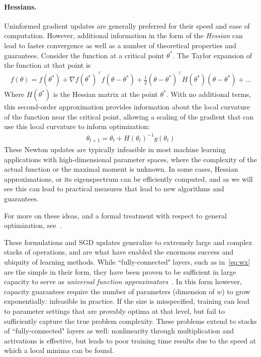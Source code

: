 \paragraph{Hessians.}
Uninformed gradient updates
are generally preferred
for their speed and ease of computation.
However, additional information in the form of the \textit{Hessian}
can lead to faster convergence
as well as a number of theoretical properties and guarantees.
Consider the function at a critical point $\theta^*$.
The Taylor expansion of the function at that point is
\begin{align}
f(\theta) = f(\theta^*) + \nabla f(\theta^*)^\top f(\theta - \theta^*) + \frac{1}{2}(\theta - \theta^*)^\top H(\theta^*)(\theta - \theta^*) + \ldots
\end{align}
Where $H(\theta^*)$ is the Hessian matrix at the point $\theta^*$. 
With no additional terms, this second-order approximation provides information
about the local curvature of the function near the critical point,
allowing a scaling of the gradient that can use this local 
curvature to inform optimization:
\begin{align}\label{eq:newtonstep}
	\theta_{t+1} = \theta_t + H(\theta_t)^{-1} g(\theta_t)
\end{align}
These Newton updates are typically infeasible in most
machine learning applications with high-dimensional
parameter spaces, where the complexity of
the actual function or the maximal moment is unknown.
In some cases, Hessian approximations,
or its eigenspectrum can be efficiently computed,
and as we will see this can lead to 
practical measures that lead to new
algorithms and guarantees.

For more on these ideas, 
and a formal treatment with respect to 
general optimization, see~\cite{wright1999numerical}.

These formulations and SGD updates generalize
to extremely large and complex stacks
of operations, and are what have enabled
the enormous success and ubiquity of learning
methods.
While ``fully-connected" layers, such as
in~\eqref{eq:wx} are the simple in their form,
they have been proven to be sufficient
in large capacity to serve as
\textit{universal function approximators}~\citep{cybenko1989approximation}.
In this form however, capacity guarantees
require the number of parameters (dimension of $w$)
to grow exponentially: infeasible in practice.
If the size is misspecified, training
can lead to parameter settings that are provably
optima at that level, but fail to sufficiently
capture the true problem complexity.
These problems extend to stacks of ``fully-connected"
layers as well: nonlinearity through multiplication
and activations is effective, but leads
to poor training time results due to 
the speed at which a local minima can be found.

